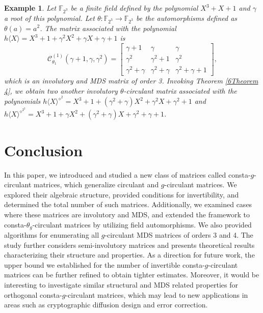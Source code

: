 \documentclass[12pt]{article}
\newtheorem{example}{Example}
\begin{document}
\begin{example}
	Let $\mathbb{F}_{2^3}$ be  a finite field defined by the polynomial $X^3+X+1$ and $\gamma$ a root of this polynomial. Let $\theta:\mathbb{F}_{2^3}\longrightarrow \mathbb{F}_{2^3}$ be the automorphisms defined as $\theta(a)=a^2$. The matrix associated with the polynomial $h\langle X \rangle=X^3+1+\gamma^2X^2+\gamma X+\gamma+1$  is 
	$$\mathcal{C}_{\theta_1}^{(1)}(\gamma+1, \gamma, \gamma^2)=\begin{bmatrix}
		\gamma+1&\gamma&\gamma\\
		\gamma^2&\gamma^2+1&\gamma^2\\
		\gamma^2+\gamma&\gamma^2+\gamma&\gamma^2+\gamma+1
	\end{bmatrix},$$
	which is an involutory and MDS matrix of order 3. Invoking  Theorem \ref{6Theorem 4}, we obtain two another involutory $\theta$-circulant matrix associated with the polynomials $h\langle X \rangle^{{\diamond}^2}=X^3+1+(\gamma^2+\gamma)X^2+\gamma^2X+\gamma^2+1$ and $h\langle X \rangle^{{\diamond}^{2^2}}=X^3+1+\gamma X^2+(\gamma^2+\gamma)X+\gamma^2+\gamma+1$.
\end{example}
\section{\textbf{Conclusion}}
\quad In this paper, we introduced and studied a new class of matrices called consta-\(g\)-circulant matrices, which generalize circulant and \(g\)-circulant matrices. We explored their algebraic structure, provided conditions for invertibility, and determined the total number of such matrices. Additionally, we examined cases where these matrices are involutory and MDS, and extended the framework to consta-\(\theta_g\)-circulant matrices by utilizing field automorphisms. We also provided algorithms for enumerating all 
$g$-circulant MDS matrices of orders 3 and 4. The study further considers semi-involutory matrices and presents theoretical results characterizing their structure and properties. As a direction for future work, the upper bound we established for the number of invertible consta-$g$-circulant matrices can be further refined to obtain tighter estimates. Moreover, it would be interesting to investigate similar structural and MDS related properties for orthogonal consta-$g$-circulant matrices, which may lead to new applications in areas such as cryptographic diffusion design and error correction.


\end{document}
